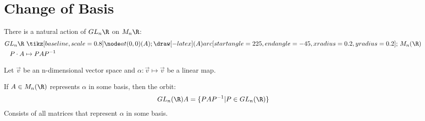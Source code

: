 \documentclass[../Main.tex]{subfiles}
\begin{document}
\section{Change of Basis}
There is a natural action of $GL_n{\R}$ on $M_n{\R}$:
\begin{align*}
    GL_n{\R} &\actson M_n(\R) \\
    P \cdot A &\mapsto PAP^{-1}
\end{align*}
\begin{proposition}
    Let $\vec{v}$ be an n-dimensional vector space and $\alpha : \vec{v} \mapsto \vec{v}$ be a linear map.\par
    If $A \in M_n(\R)$ represents $\alpha$ in some basis, then the orbit:
    \begin{equation*}
        GL_n(\R)A = \{PAP^{-1} | P \in GL_n(\R)\} 
    \end{equation*}
    Consists of all matrices that represent $\alpha$ in some basis.
\end{proposition}
\end{document}
